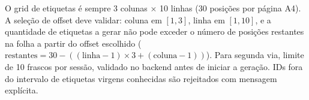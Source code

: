 \begin{regra}
O grid de etiquetas é sempre 3 colunas × 10 linhas (30 posições por página A4). A seleção de offset deve validar: coluna em $[1, 3]$, linha em $[1, 10]$, e a quantidade de etiquetas a gerar não pode exceder o número de posições restantes na folha a partir do offset escolhido ($\text{restantes} = 30 - ((\text{linha} - 1) \times 3 + (\text{coluna} - 1))$). Para segunda via, limite de 10 frascos por sessão, validado no backend antes de iniciar a geração. IDs fora do intervalo de etiquetas virgens conhecidas são rejeitados com mensagem explícita.
\end{regra}


